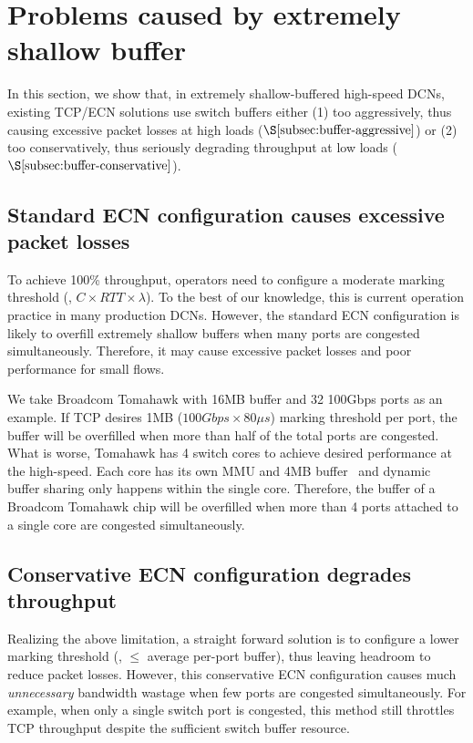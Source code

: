 \section{Problems caused by extremely shallow buffer}\label{sec:problem}
In this section, we show that, in extremely shallow-buffered high-speed DCNs, existing TCP/ECN solutions use switch buffers either (1) too aggressively, thus causing excessive packet losses at high loads ($\S\ref{subsec:buffer-aggressive}$) or (2) too conservatively, thus seriously degrading throughput at low loads ($\S\ref{subsec:buffer-conservative}$).

\subsection{Standard ECN configuration causes excessive packet losses}\label{subsec:buffer-aggressive}
To achieve 100\% throughput, operators need to configure a moderate marking threshold (\eg, $C\times RTT \times \lambda$). To the best of our knowledge, this is current operation practice in many production DCNs. However, the standard ECN configuration is likely to overfill extremely shallow buffers when many ports are congested simultaneously. Therefore, it may cause excessive packet losses and poor performance for small flows.

We take Broadcom Tomahawk with 16MB buffer and 32 100Gbps ports as an example. If TCP desires 1MB ($100Gbps\times 80\mu s$) marking threshold per port, the buffer will be overfilled when more than half of the total ports are congested. What is worse, Tomahawk has 4 switch cores to achieve desired performance at the high-speed. Each core has its own MMU and 4MB buffer~\cite{tomahawk_buffer1,tomahawk_buffer2} and dynamic buffer sharing only happens within the single core. Therefore, the buffer of a Broadcom Tomahawk chip will be overfilled when more than 4 ports attached to a single core are congested simultaneously.

\subsection{Conservative ECN configuration degrades throughput}\label{subsec:buffer-conservative}
Realizing the above limitation, a straight forward solution is to configure a lower marking threshold (\eg, $\leq$ average per-port buffer), thus leaving headroom to reduce packet losses. However, this conservative ECN configuration causes much \emph{unnecessary} bandwidth wastage when few ports are congested simultaneously. For example, when only a single switch port is congested, this method still throttles TCP throughput despite the sufficient switch buffer resource.




